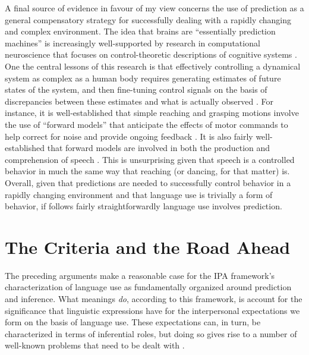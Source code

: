 A final source of evidence in favour of my view concerns the use of prediction as a general compensatory strategy for successfully dealing with a rapidly changing and complex environment. The idea that brains are ``essentially prediction machines'' \citep[][p. 181]{clark:2013} is increasingly well-supported by research in computational neuroscience that focuses on control-theoretic descriptions of cognitive systems \citep{Eliasmith:2013,Grush:2004,Eliasmith:2010,EliasmithAnderson:2003}. One the central lessons of this research is that effectively controlling a dynamical system as complex as a human body requires generating estimates of future states of the system, and then fine-tuning control signals on the basis of discrepancies between these estimates and what is actually observed \citep{Grush:2004,Pickering:2013,Pickering:2007}. For instance, it is well-established that simple reaching and grasping motions involve the use of ``forward models'' that anticipate the effects of motor commands to help correct for noise and provide ongoing feedback \citep{Pickering:2013,Pickering:2007}. It is also fairly well-established that forward models are involved in both the production and comprehension of speech \citep{Pickering:2013,Pickering:2007}. This is unsurprising given that speech is a controlled behavior in much the same way that reaching (or dancing, for that matter) is. Overall, given that predictions are needed to successfully control behavior in a rapidly changing environment and that language use is trivially a form of behavior, if follows fairly straightforwardly language use involves prediction. 

\section{The Criteria and the Road Ahead}

The preceding arguments make a reasonable case for the IPA framework's characterization of language use as fundamentally organized around prediction and inference. What meanings \textit{do}, according to this framework, is account for the significance that linguistic expressions have for the interpersonal expectations we form on the basis of language use. These expectations can, in turn, be characterized in terms of inferential roles, but doing so gives rise to a number of well-known problems that need to be dealt with \citep{FodorLepore:1991,FodorLepore:2002}.

